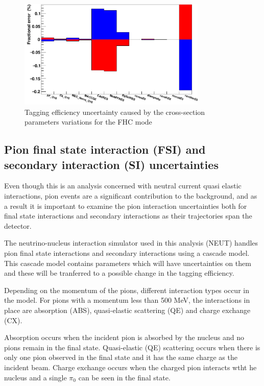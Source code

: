 \begin{figure}[!htb]
\centering
\includegraphics[width=0.8\textwidth]{Figures/xsec_uncertainty.png}
\caption{Tagging efficiency uncertainty caused by the cross-section parameters variations for the FHC mode}
\label{fig:xsecuncertainty}
\end{figure}

\subsection{Pion final state interaction (FSI) and secondary interaction (SI) uncertainties}

Even though this is an analysis concerned with neutral current quasi elastic interactions, pion events are a significant contribution to the background, and as a result it is important to examine the pion interaction uncertainties both for final state interactions and secondary interactions as their trajectories span the detector. 
\newline


The neutrino-nucleus interaction simulator used in this analysis (NEUT) handles pion final state interactions and secondary interactions using a cascade model. This cascade model contains parameters which will have uncertainties on them and these will be tranferred to a possible change in the tagging efficiency.

Depending on the momentum of the pions, different interaction types occur in the model. For pions with a momentum less than 500 MeV, the interactions in place are absorption (ABS), quasi-elastic scattering (QE) and charge exchange (CX).

Absorption occurs when the incident pion is absorbed by the nucleus and no pions remain in the final state. Quasi-elastic (QE) scattering occurs when there is only one pion observed in the final state and it has the same charge as the incident beam. Charge exchange occurs when the charged pion interacts wtht he nucleus and a single $\pi_{0}$ can be seen in the final state.


